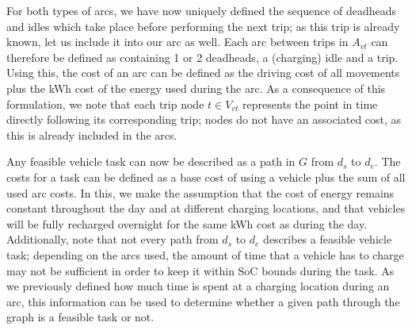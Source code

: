 \documentclass[]{article}
\begin{document}
For both types of arcs, we have now uniquely defined the sequence of deadheads and idles which take place before performing the next trip; as this trip is already known, let us include it into our arc as well. Each arc between trips in $A_{vt}$ can therefore be defined as containing 1 or 2 deadheads, a (charging) idle and a trip. Using this, the cost of an arc can be defined as the driving cost of all movements plus the kWh cost of the energy used during the arc. As a consequence of this formulation, we note that each trip node $t \in V_{vt}$ represents the point in time directly following its corresponding trip; nodes do not have an associated cost, as this is already included in the arcs. 

Any feasible vehicle task can now be described as a path in $G$ from $d_s$ to $d_e$. The costs for a task can be defined as a base cost of using a vehicle plus the sum of all used arc costs. In this, we make the assumption that the cost of energy remains constant throughout the day and at different charging locations, and that vehicles will be fully recharged overnight for the same kWh cost as during the day. Additionally, note that not every path from $d_s$ to $d_e$ describes a feasible vehicle task; depending on the arcs used, the amount of time that a vehicle has to charge may not be sufficient in order to keep it within SoC bounds during the task. As we previously defined how much time is spent at a charging location during an arc, this information can be used to determine whether a given path through the graph is a feasible task or not.
\end{document}
